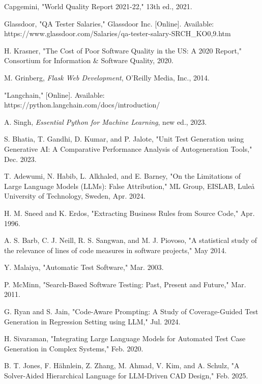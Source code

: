 \documentclass[12pt, twoside]{report}
\begin{document}
\begin{thebibliography}{99}

Capgemini, "World Quality Report 2021-22," 13th ed., 2021.

Glassdoor, "QA Tester Salaries," Glassdoor Inc. [Online]. Available: https://www.glassdoor.com/Salaries/qa-tester-salary-SRCH\_KO0,9.htm

H. Krasner, "The Cost of Poor Software Quality in the US: A 2020 Report," Consortium for Information \& Software Quality, 2020.

M. Grinberg, \textit{Flask Web Development}, O'Reilly Media, Inc., 2014.

"Langchain," [Online]. Available: https://python.langchain.com/docs/introduction/

A. Singh, \textit{Essential Python for Machine Learning}, new ed., 2023.

S. Bhatia, T. Gandhi, D. Kumar, and P. Jalote, "Unit Test Generation using Generative AI: A Comparative Performance Analysis of Autogeneration Tools," Dec. 2023.

T. Adewumi, N. Habib, L. Alkhaled, and E. Barney, "On the Limitations of Large Language Models (LLMs): False Attribution," ML Group, EISLAB, Luleå University of Technology, Sweden, Apr. 2024.

H. M. Sneed and K. Erdos, "Extracting Business Rules from Source Code," Apr. 1996.

A. S. Barb, C. J. Neill, R. S. Sangwan, and M. J. Piovoso, "A statistical study of the relevance of lines of code measures in software projects," May 2014.

Y. Malaiya, "Automatic Test Software," Mar. 2003.

P. McMinn, "Search-Based Software Testing: Past, Present and Future," Mar. 2011.

G. Ryan and S. Jain, "Code-Aware Prompting: A Study of Coverage-Guided Test Generation in Regression Setting using LLM," Jul. 2024.

H. Sivaraman, "Integrating Large Language Models for Automated Test Case Generation in Complex Systems," Feb. 2020.

B. T. Jones, F. Hähnlein, Z. Zhang, M. Ahmad, V. Kim, and A. Schulz, "A Solver-Aided Hierarchical Language for LLM-Driven CAD Design," Feb. 2025.


\end{thebibliography}
\end{document}
